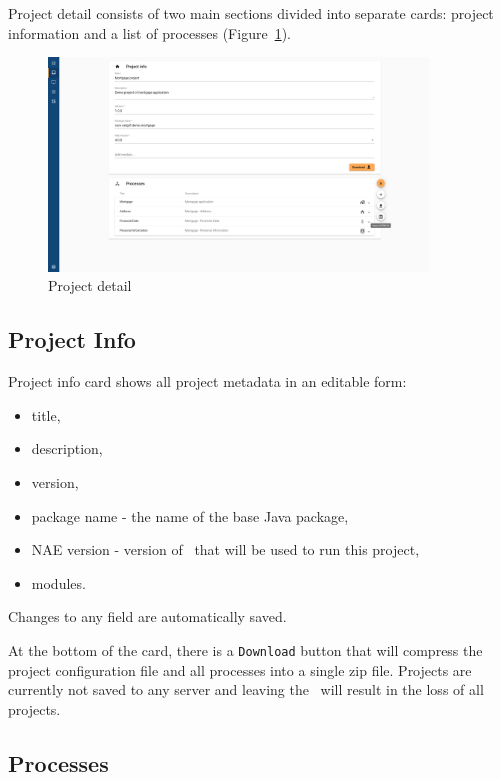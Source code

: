 
Project detail consists of two main sections divided into separate cards: project information and a list of processes (Figure~\ref{fig:project_detail}).

\begin{figure}[h!]
  \centering
  \includegraphics[width=0.9\textwidth]{images/project_view.png}
  \caption{Project detail}
  \label{fig:project_detail}
\end{figure}

\subsection{Project Info}\label{subsec:project-info}

Project info card shows all project metadata in an editable form:
\begin{itemize}
  \item title,
  \item description,
  \item version,
  \item package name - the name of the base Java package,
  \item NAE version - version of \engine~that will be used to run this project,
  \item modules.
\end{itemize}
Changes to any field are automatically saved.

At the bottom of the card, there is a \texttt{Download} button that will compress the project configuration file and all processes into a single zip file.
Projects are currently not saved to any server and leaving the \builder~will result in the loss of all projects.

\subsection{Processes}\label{subsec:processes}

